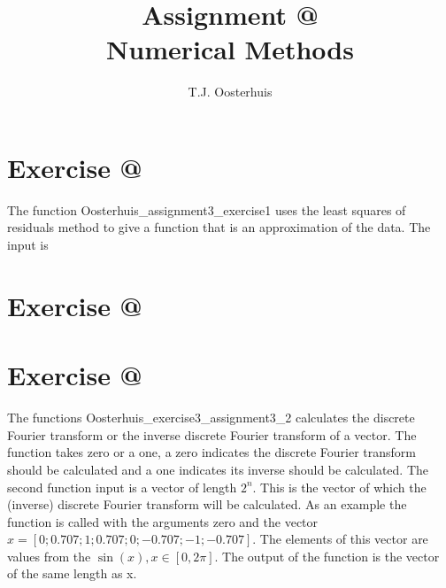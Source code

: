 \documentclass[12pt]{article}
\makeatletter
\newcommand*{\rom}[1]{\expandafter\@slowromancap\romannumeral #1@}
\makeatother
\begin{document}
 
 
\title{Assignment \rom{3} \\
\large Numerical Methods} 
\author{T.J. Oosterhuis}
\maketitle
%
\section*{Exercise \rom{1}}
The function Oosterhuis\_assignment3\_exercise1 uses the least squares of residuals method to give a function that is an approximation of the data. The input is 




\section*{Exercise \rom{2}}






\section*{Exercise \rom{3}}

The functions Oosterhuis\_exercise3\_assignment3\_2 calculates the discrete Fourier transform or the inverse discrete Fourier transform of a vector. The function takes zero or a one, a zero indicates the discrete Fourier transform should be calculated and  a one indicates its inverse should be calculated. The second function input is a vector of length $2^n$. This is the vector of which the (inverse) discrete Fourier transform will be calculated. As an example the function is called with the arguments zero and the vector $x = [0;0.707;1;0.707;0;-0.707;-1;-0.707]$. The elements of this vector are values from the $\sin(x), x\in[0,2\pi]$. The output of the function is the vector of the same length as x.
\end{document}
